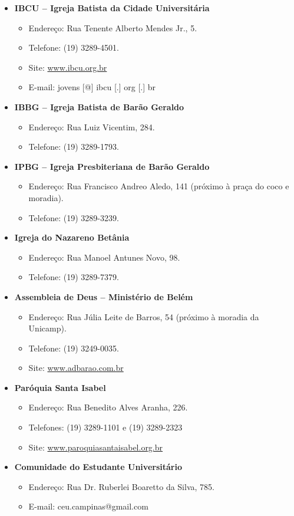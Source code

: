 \begin{itemize}
\item  \textbf{IBCU -- Igreja Batista da Cidade Universitária}
\begin{itemize}
\item  Endereço: Rua Tenente Alberto Mendes Jr., 5.
\item  Telefone: (19) 3289-4501.
\item  Site: \url{www.ibcu.org.br}
\item  E-mail: jovens [@] ibcu [.] org [.] br
\end{itemize}

\item  \textbf{IBBG -- Igreja Batista de Barão Geraldo}
\begin{itemize}
\item  Endereço: Rua Luiz Vicentim, 284.
\item  Telefone: (19) 3289-1793.
\end{itemize}

\item  \textbf{IPBG -- Igreja Presbiteriana de Barão Geraldo}
\begin{itemize}
\item  Endereço: Rua Francisco Andreo Aledo, 141 (próximo à praça do coco e moradia).
\item  Telefone: (19) 3289-3239.
\end{itemize}

\item  \textbf{Igreja do Nazareno Betânia}
\begin{itemize}
\item  Endereço: Rua Manoel Antunes Novo, 98.
\item  Telefone: (19) 3289-7379.
\end{itemize}

\item  \textbf{Assembleia de Deus -- Ministério de Belém}
\begin{itemize}
\item  Endereço: Rua Júlia Leite de Barros, 54 (próximo à moradia da Unicamp).
\item  Telefone: (19) 3249-0035.
\item  Site: \url{www.adbarao.com.br}
\end{itemize}

\item  \textbf{Paróquia Santa Isabel}
\begin{itemize}
\item  Endereço: Rua Benedito Alves Aranha, 226.
\item  Telefones: (19) 3289-1101 e (19) 3289-2323
\item  Site: \url{www.paroquiasantaisabel.org.br}
\end{itemize}

\item  \textbf{Comunidade do Estudante Universitário}
\begin{itemize}
\item  Endereço: Rua Dr. Ruberlei Boaretto da Silva, 785.
\item  E-mail: ceu.campinas@gmail.com
\end{itemize}
\end{itemize}

